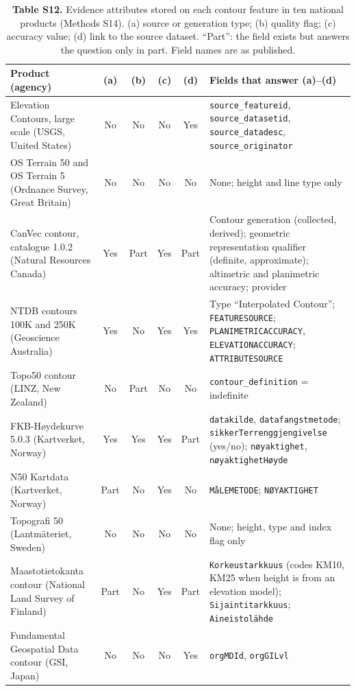 \documentclass[11pt]{article}
\begin{document}
\begin{table}[!htbp]
\centering
\caption*{\textbf{Table S12.} Evidence attributes stored on each contour feature in ten national products (Methods S14). (a) source or generation type; (b) quality flag; (c) accuracy value; (d) link to the source dataset. ``Part'': the field exists but answers the question only in part. Field names are as published.}
\vspace{2mm}
\scriptsize
\setlength{\tabcolsep}{3pt}
\begin{tabularx}{\textwidth}{@{}p{38mm}ccccX@{}}
\toprule
Product (agency) & (a) & (b) & (c) & (d) & Fields that answer (a)--(d) \\
\midrule
Elevation Contours, large scale (USGS, United States) & No & No & No & Yes & \texttt{source\_featureid}, \texttt{source\_datasetid}, \texttt{source\_datadesc}, \texttt{source\_originator} \\
OS Terrain 50 and OS Terrain 5 (Ordnance Survey, Great Britain) & No & No & No & No & None; height and line type only \\
CanVec contour, catalogue 1.0.2 (Natural Resources Canada) & Yes & Part & Yes & Part & Contour generation (collected, derived); geometric representation qualifier (definite, approximate); altimetric and planimetric accuracy; provider \\
NTDB contours 100K and 250K (Geoscience Australia) & Yes & No & Yes & Yes & Type ``Interpolated Contour''; \texttt{FEATURESOURCE}; \texttt{PLANIMETRICACCURACY}, \texttt{ELEVATIONACCURACY}; \texttt{ATTRIBUTESOURCE} \\
Topo50 contour (LINZ, New Zealand) & No & Part & No & No & \texttt{contour\_definition} = indefinite \\
FKB-H{\o}ydekurve 5.0.3 (Kartverket, Norway) & Yes & Yes & Yes & Part & \texttt{datakilde}, \texttt{datafangstmetode}; \texttt{sikkerTerrenggjengivelse} (yes/no); \texttt{n{\o}yaktighet}, \texttt{n{\o}yaktighetH{\o}yde} \\
N50 Kartdata (Kartverket, Norway) & Part & No & Yes & No & \texttt{M{\aa}LEMETODE}; \texttt{N{\O}YAKTIGHET} \\
Topografi 50 (Lantm\"ateriet, Sweden) & No & No & No & No & None; height, type and index flag only \\
Maastotietokanta contour (National Land Survey of Finland) & Part & No & Yes & Part & \texttt{Korkeustarkkuus} (codes KM10, KM25 when height is from an elevation model); \texttt{Sijaintitarkkuus}; \texttt{Aineistol\"ahde} \\
Fundamental Geospatial Data contour (GSI, Japan) & No & No & No & Yes & \texttt{orgMDId}, \texttt{orgGILvl} \\
\bottomrule
\end{tabularx}


\end{table}
\end{document}
